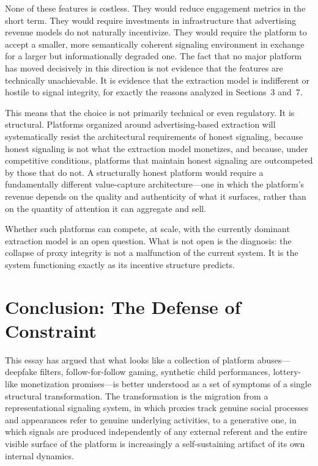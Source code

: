 \documentclass[12pt, a4paper]{article}
\begin{document}
None of these features is costless. They would reduce engagement metrics in the short term. They would require investments in infrastructure that advertising revenue models do not naturally incentivize. They would require the platform to accept a smaller, more semantically coherent signaling environment in exchange for a larger but informationally degraded one. The fact that no major platform has moved decisively in this direction is not evidence that the features are technically unachievable. It is evidence that the extraction model is indifferent or hostile to signal integrity, for exactly the reasons analyzed in Sections~3 and~7.

This means that the choice is not primarily technical or even regulatory. It is structural. Platforms organized around advertising-based extraction will systematically resist the architectural requirements of honest signaling, because honest signaling is not what the extraction model monetizes, and because, under competitive conditions, platforms that maintain honest signaling are outcompeted by those that do not. A structurally honest platform would require a fundamentally different value-capture architecture---one in which the platform's revenue depends on the quality and authenticity of what it surfaces, rather than on the quantity of attention it can aggregate and sell.

Whether such platforms can compete, at scale, with the currently dominant extraction model is an open question. What is not open is the diagnosis: the collapse of proxy integrity is not a malfunction of the current system. It is the system functioning exactly as its incentive structure predicts.

\section{Conclusion: The Defense of Constraint}

This essay has argued that what looks like a collection of platform abuses---deepfake filters, follow-for-follow gaming, synthetic child performances, lottery-like monetization promises---is better understood as a set of symptoms of a single structural transformation. The transformation is the migration from a representational signaling system, in which proxies track genuine social processes and appearances refer to genuine underlying activities, to a generative one, in which signals are produced independently of any external referent and the entire visible surface of the platform is increasingly a self-sustaining artifact of its own internal dynamics.
\end{document}
